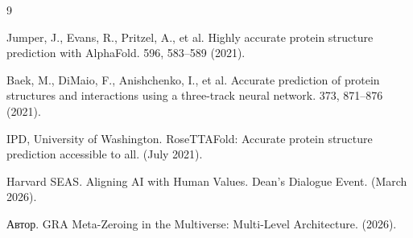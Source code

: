 \documentclass[11pt]{article}
\begin{document}
\begin{thebibliography}{9}

Jumper, J., Evans, R., Pritzel, A., et al.
\newblock Highly accurate protein structure prediction with AlphaFold.
 596, 583--589 (2021).

Baek, M., DiMaio, F., Anishchenko, I., et al.
\newblock Accurate prediction of protein structures and interactions using a three-track neural network.
 373, 871--876 (2021).

IPD, University of Washington.
\newblock RoseTTAFold: Accurate protein structure prediction accessible to all.
 (July 2021).

Harvard SEAS.
\newblock Aligning AI with Human Values. Dean's Dialogue Event.
 (March 2026).

Автор.
\newblock GRA Meta-Zeroing in the Multiverse: Multi-Level Architecture.
 (2026).

\end{thebibliography}
\end{document}
